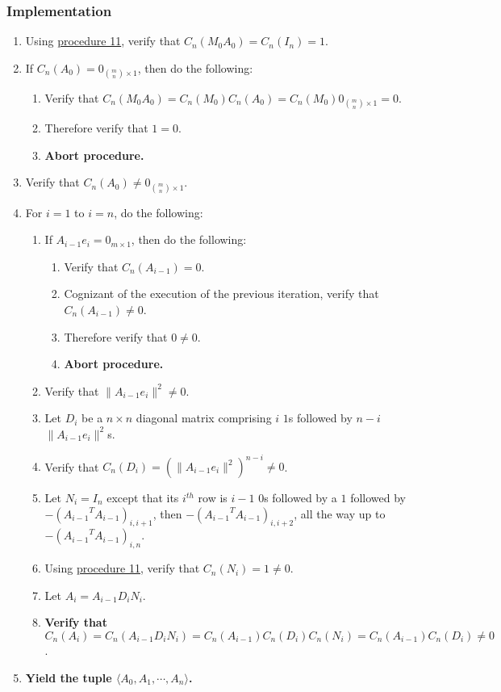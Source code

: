 \documentclass[twocolumn]{article}
\begin{document}
			\subsubsection{Implementation}
				\begin{enumerate}
					\item Using \hyperref[sec:procedure 11]{procedure 11}, verify that $C_n(M_0A_0)=C_n(I_n)=1$.
					\item If $C_n(A_0)=0_{\binom{m}{n}\times 1}$, then do the following:
					\begin{enumerate}
						\item Verify that $C_n(M_0A_0)=C_n(M_0)C_n(A_0)=C_n(M_0)0_{\binom{m}{n}\times 1}=0$.
						\item Therefore verify that $1=0$.
						\item \textbf{Abort procedure.}
					\end{enumerate}
					\item Verify that $C_n(A_0)\ne0_{\binom{m}{n}\times 1}$.
					\item For $i=1$ to $i=n$, do the following:
					\begin{enumerate}
						\item If $A_{i-1}e_i=0_{m\times 1}$, then do the following:
						\begin{enumerate}
							\item Verify that $C_n(A_{i-1})=0$.
							\item Cognizant of the execution of the previous iteration, verify that $C_n(A_{i-1})\ne 0$.
							\item Therefore verify that $0\ne 0$.
							\item \textbf{Abort procedure.}
						\end{enumerate}
						\item Verify that $\lVert A_{i-1}e_i\rVert^2\ne 0$.
						\item Let $D_i$ be a $n\times n$ diagonal matrix comprising $i$ $1$s followed by $n-i$ $\lVert A_{i-1}e_i\rVert^2$s.
						\item Verify that $C_n(D_i)=(\lVert A_{i-1}e_i\rVert^2)^{n-i}\ne 0$.
						\item Let $N_i=I_n$ except that its $i^{th}$ row is $i-1$ $0$s followed by a $1$ followed by $-({A_{i-1}}^TA_{i-1})_{i,i+1}$, then $-({A_{i-1}}^TA_{i-1})_{i,i+2}$, all the way up to $-({A_{i-1}}^TA_{i-1})_{i,n}$.
						\item Using \hyperref[sec:procedure 11]{procedure 11}, verify that $C_n(N_i)=1\ne 0$.
						\item Let $A_i=A_{i-1}D_iN_i$.
						\item \textbf{Verify that $C_n(A_i)=C_n(A_{i-1}D_iN_i)=C_n(A_{i-1})C_n(D_i)C_n(N_i)=C_n(A_{i-1})C_n(D_i)\ne 0$}.
					\end{enumerate}
					\item \textbf{Yield the tuple $\langle A_0,A_1,\cdots,A_n\rangle$.}
				\end{enumerate}
\end{document}
